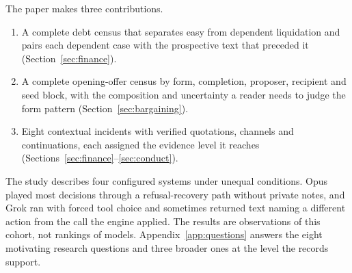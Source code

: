 The paper makes three contributions.
\begin{enumerate}
\item A complete debt census that separates easy from dependent liquidation and pairs each dependent case with the prospective text that preceded it (Section~\ref{sec:finance}).
\item A complete opening-offer census by form, completion, proposer, recipient and seed block, with the composition and uncertainty a reader needs to judge the form pattern (Section~\ref{sec:bargaining}).
\item Eight contextual incidents with verified quotations, channels and continuations, each assigned the evidence level it reaches (Sections~\ref{sec:finance}--\ref{sec:conduct}).
\end{enumerate}

The study describes four configured systems under unequal conditions. Opus played most decisions through a refusal-recovery path without private notes, and Grok ran with forced tool choice and sometimes returned text naming a different action from the call the engine applied. The results are observations of this cohort, not rankings of models. Appendix~\ref{app:questions} answers the eight motivating research questions and three broader ones at the level the records support.
